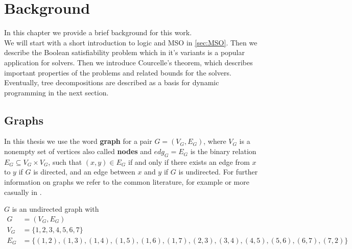 \documentclass[a4paper, 12pt, bibliography=totoc]{scrartcl}
\begin{document}
\newpage
\section{Background}\label{sec:bg}
In this chapter we provide a brief background for this work.\\
We will start with a short introduction to logic and MSO in \ref{sec:MSO}. Then we describe the Boolean satisfiability problem which in it's variants is a popular application for solvers.
Then we introduce Courcelle's theorem, which describes important properties of the problems and related bounds for the solvers.
Eventually, tree decompositions are described as a basis for dynamic programming in the next section.

\subsection{Graphs}

In this thesis we use the word \textbf{graph} for a pair $G=(V_{G},E_{G})$, where $V_{G}$ is a nonempty set of vertices also called \textbf{nodes} and $edg_{G} = E_{G}$ is the binary relation $E_{G} \subseteq V_{G} \times V_{G}$, such that $(x,y)\in E_{G}$ if and only if there exists an edge from $x$ to $y$ if $G$ is directed, and an edge between $x$ and $y$ if $G$ is undirected. For further information on graphs we refer to the common literature, for example \cite[p. {401--412}]{HandbookMathGraph} or more casually in \cite{britannicagraphs}. 

\begin{example}\label{ex:wheelgraph}
	$G$ is an undirected graph with
	\begin{align*}
	 G&=(V_{G},E_{G})\\
	 	 V_{G} &= \{1,2,3,4,5,6,7\}\\
	   E_{G} &= \{(1,2),(1,3), (1,4), (1,5),(1,6), (1,7), (2,3), (3,4), (4,5), (5,6), (6,7), (7,2)\}
	\end{align*}
\end{example}
\end{document}
